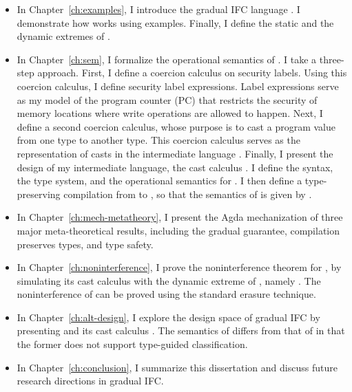 \begin{itemize}
  \item In Chapter~\ref{ch:examples}, I introduce the gradual IFC language
    \Surface. I demonstrate how \Surface works using examples. Finally, I define
    the static and the dynamic extremes of \Surface.
  \item In Chapter~\ref{ch:sem}, I formalize the operational semantics of
    \Surface. I take a three-step approach. First, I define a coercion calculus
    on security labels. Using this coercion calculus, I define security label
    expressions. Label expressions serve as my model of the program counter (PC)
    that restricts the security of memory locations where write operations are
    allowed to happen. Next, I define a second coercion calculus, whose purpose
    is to cast a program value from one type to another type. This coercion
    calculus serves as the representation of casts in the intermediate language
    \CC. Finally, I present the design of my intermediate language, the cast
    calculus \CC. I define the syntax, the type system, and the operational
    semantics for \CC. I then define a type-preserving compilation from \Surface
    to \CC, so that the semantics of \Surface is given by \CC.
  \item In Chapter~\ref{ch:mech-metatheory}, I present the Agda mechanization of
    three major meta-theoretical results, including the gradual guarantee,
    compilation preserves types, and type safety.
  \item In Chapter~\ref{ch:noninterference}, I prove the noninterference theorem
    for \Surface, by simulating its cast calculus \CC with the dynamic extreme
    of \Surface, namely \DynIFC. The noninterference of \DynIFC can be proved
    using the standard erasure technique.
  \item In Chapter~\ref{ch:alt-design}, I explore the design space of gradual
    IFC by presenting \SurfaceOld and its cast calculus \CCOld. The semantics of
    \SurfaceOld differs from that of \Surface in that the former does not
    support type-guided classification.
  \item In Chapter~\ref{ch:conclusion}, I summarize this dissertation
    and discuss future research directions in gradual IFC.
\end{itemize}
